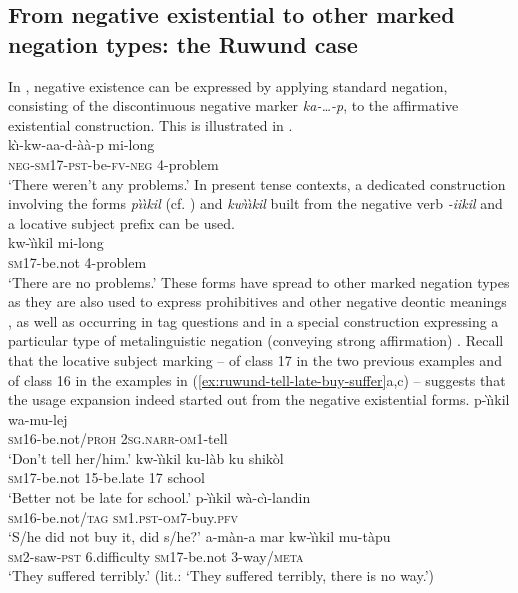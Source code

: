 \documentclass[output=paper]{langsci/langscibook}
\begin{document}
\subsection{From negative existential to other marked negation types: the
Ruwund case}\label{sec:1:6.2}
%
In , negative existence can be expressed by applying standard
negation, consisting of the discontinuous negative marker
\textit{ka-\ldots{}-p}, to the affirmative existential construction. This
is illustrated in .
%
\ea\label{ex:ruwund-problem-pst} \\ \gll k{\`\i}-kw-aa-d-{\`a}{\`a}-p mi-long\\
\textsc{neg-sm17-pst}-be-\textsc{fv-neg} 4-problem\\ \glt 	`There weren’t
any problems.' \z
%
In present tense contexts, a dedicated construction involving the forms
\textit{p{\`\i}{\`\i}kil} (cf. ) and
\textit{kw{\`\i}{\`\i}kil} built from the negative verb \textit{-iikil} and
a locative subject prefix can be used.
%
\ea\label{ex:ruwund-problem-prs} \\ \gll kw-{\`\i}{\`\i}kil mi-long\\
\textsc{sm}17-be.not  4-problem\\ \glt 	`There are no problems.' \z
%
These forms have spread to other marked negation types as they are also
used to express prohibitives  and other negative
deontic meanings , as well as occurring in tag
questions  and in a special construction expressing a
particular type of metalinguistic negation (conveying strong affirmation)
. Recall that the locative subject marking -- of
class 17 in the two previous examples and of class 16 in the examples in
(\ref{ex:ruwund-tell-late-buy-suffer}a,c) 
-- suggests that the usage expansion indeed started out from the negative
existential forms.
%
\ea\label{ex:ruwund-tell-late-buy-suffer} 
%
\ea\label{ex:ruwund-tell} \gll p-{\`\i}{\`\i}kil wa-mu-lej\\
\textsc{sm}16-be.not/\textsc{proh} 2\textsc{sg.narr}-\textsc{om}1-tell\\
\glt 	`Don’t tell her/him.'
%
\ex\label{ex:ruwund-late} \gll kw-{\`\i}{\`\i}kil ku-l{\`a}b ku
shik{\`o}l\\ \textsc{sm}17-be.not 15-be.late 17 school\\ \glt 	`Better not
be late for school.'
%
\ex\label{ex:ruwund-buy} \gll p-{\`\i}{\`\i}kil w{\`a}-c{\`\i}-landin\\
\textsc{sm}16-be.not/\textsc{tag} \textsc{sm1.pst-om}7-buy.\textsc{pfv}\\
\glt 	`S/he did not buy it, did s/he?'
%
\ex\label{ex:ruwund-suffer} \gll a-m{\`a}n-a mar kw-{\`\i}{\`\i}kil
mu-t{\`a}pu\\ \textsc{sm}2-saw-\textsc{pst} 6.difficulty
\textsc{sm}17-be.not 3-way/\textsc{meta}\\ \glt 	`They suffered
terribly.' (lit.: `They suffered terribly, there is no way.') \z\z
%
\end{document}

